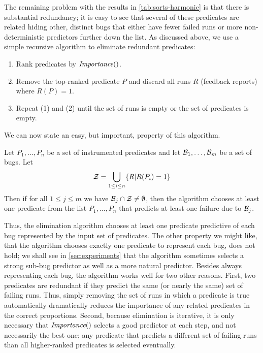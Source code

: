 The remaining problem with the results in \autoref{tab:sorts-harmonic}
is that there is substantial redundancy; it is easy to see that several of these
predicates are related hiding other, distinct bugs that either have
fewer failed runs or more non-deterministic predictors further down the
list.  As discussed above, we use a simple recursive algorithm to eliminate
redundant predicates:
\begin{enumerate}

\item Rank predicates by $\textit{Importance}()$.

\item Remove the top-ranked predicate $P$ and discard all runs $R$ (feedback reports) where  $R(P) = 1$.

\item Repeat (1) and (2) until the set of runs is empty or the set of predicates is empty.
\end{enumerate}




We can now state an easy, but important, property of this algorithm.  
\begin{lemma}
\rm
Let $P_1,\ldots,P_n$ be a set of instrumented predicates and let ${\cal B}_1,\ldots,{\cal B}_m$ be a set of bugs.  Let
\[ {\cal Z} = \bigcup_{1 \leq i \leq n} \{ R | R(P_i) = 1 \} \]
Then if for all $1 \leq j \leq m$ we have ${\cal B}_j \cap {\cal Z} \neq \emptyset$, then 
the algorithm chooses at least one predicate from the list $P_1,\ldots,P_n$ that predicts
at least one failure due to ${\cal B}_j$.
\end{lemma}

Thus, the elimination algorithm chooses at least one predicate 
predictive of each bug represented by the input set of predicates.
The other property we might like, that the algorithm chooses exactly
one predicate to represent each bug, does not hold; we shall see in
\autoref{sec:experiments} that the algorithm sometimes selects a
strong sub-bug predictor as well as a more natural predictor.  Besides
always representing each bug, the algorithm works well for two other
reasons.  First, two predicates are redundant if they predict the same
(or nearly the same) set of failing runs.  Thus, simply removing the
set of runs in which a predicate is true automatically dramatically
reduces the importance of any related predicates in the correct
proportions. Second, because elimination is
iterative, it is only necessary that $\textit{Importance}()$ selects a good
predictor at each step, and not necessarily the best one; any
predicate that predicts a different set of failing runs than all
higher-ranked predicates is selected eventually.


